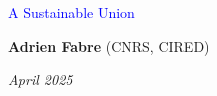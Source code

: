 \documentclass[aspectratio=169,xcolor=dvipsnames, 11pt,mathserif]{beamer}
\begin{document}
\begin{frame}
\thispagestyle{empty}
\begin{center}
\begin{LARGE}
\textcolor{blue}{A Sustainable Union}
\end{LARGE}

\vspace{1cm}
\textbf{Adrien Fabre} (CNRS, CIRED)%




\medskip
{}
\textit{April 2025} 

\end{center}

\bigskip

\end{frame}
\end{document}
